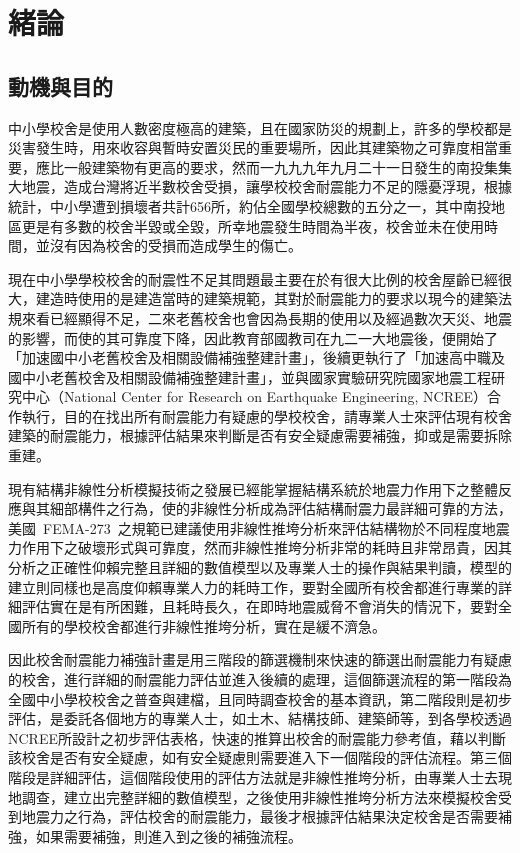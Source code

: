 % 
\chapter{緒論}
\label{cha:intro} 

\section{動機與目的}

中小學校舍是使用人數密度極高的建築，且在國家防災的規劃上，許多的學校都是災害發生時，用來收容與暫時安置災民的重要場所，因此其建築物之可靠度相當重要，應比一般建築物有更高的要求，然而一九九九年九月二十一日發生的南投集集大地震，造成台灣將近半數校舍受損，讓學校校舍耐震能力不足的隱憂浮現，根據統計，中小學遭到損壞者共計656所，約佔全國學校總數的五分之一，其中南投地區更是有多數的校舍半毀或全毀，所幸地震發生時間為半夜，校舍並未在使用時間，並沒有因為校舍的受損而造成學生的傷亡。

現在中小學學校校舍的耐震性不足其問題最主要在於有很大比例的校舍屋齡已經很大，建造時使用的是建造當時的建築規範，其對於耐震能力的要求以現今的建築法規來看已經顯得不足，二來老舊校舍也會因為長期的使用以及經過數次天災、地震的影響，而使的其可靠度下降，因此教育部國教司在九二一大地震後，便開始了「加速國中小老舊校舍及相關設備補強整建計畫」，後續更執行了「加速高中職及國中小老舊校舍及相關設備補強整建計畫」，並與國家實驗研究院國家地震工程研究中心（National Center for Research on Earthquake Engineering, NCREE）合作執行，目的在找出所有耐震能力有疑慮的學校校舍，請專業人士來評估現有校舍建築的耐震能力，根據評估結果來判斷是否有安全疑慮需要補強，抑或是需要拆除重建。

現有結構非線性分析模擬技術之發展已經能掌握結構系統於地震力作用下之整體反應與其細部構件之行為，使的非線性分析成為評估結構耐震力最詳細可靠的方法，美國~FEMA-273\cite{building1997nehrp}~之規範已建議使用非線性推垮分析來評估結構物於不同程度地震力作用下之破壞形式與可靠度，然而非線性推垮分析非常的耗時且非常昂貴，因其分析之正確性仰賴完整且詳細的數值模型以及專業人士的操作與結果判讀，模型的建立則同樣也是高度仰賴專業人力的耗時工作，要對全國所有校舍都進行專業的詳細評估實在是有所困難，且耗時長久，在即時地震威脅不會消失的情況下，要對全國所有的學校校舍都進行非線性推垮分析，實在是緩不濟急。

因此校舍耐震能力補強計畫是用三階段的篩選機制來快速的篩選出耐震能力有疑慮的校舍，進行詳細的耐震能力評估並進入後續的處理，這個篩選流程的第一階段為全國中小學校校舍之普查與建檔，且同時調查校舍的基本資訊，第二階段則是初步評估，是委託各個地方的專業人士，如土木、結構技師、建築師等，到各學校透過NCREE所設計之初步評估表格，快速的推算出校舍的耐震能力參考值，藉以判斷該校舍是否有安全疑慮，如有安全疑慮則需要進入下一個階段的評估流程。第三個階段是詳細評估，這個階段使用的評估方法就是非線性推垮分析，由專業人士去現地調查，建立出完整詳細的數值模型，之後使用非線性推垮分析方法來模擬校舍受到地震力之行為，評估校舍的耐震能力，最後才根據評估結果決定校舍是否需要補強，如果需要補強，則進入到之後的補強流程。

